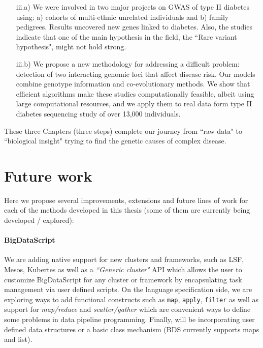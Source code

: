\begin{itemize}
	\begin{itemize}
	\item[iii.a)] We were involved in two major projects on GWAS of type II diabetes using: a) cohorts of multi-ethnic unrelated individuals and b) family pedigrees. Results uncovered new genes linked to diabetes. Also, the studies indicate that one of the main hypothesis in the field, the ``Rare variant hypothesis", might not hold strong.
	
	\item[iii.b)] We propose a new methodology for addressing a difficult problem: detection of two interacting genomic loci that affect disease risk. Our models combine genotype information and co-evolutionary methods. We show that efficient algorithms make these studies computationally feasible, albeit using large computational resources, and we apply them to real data form type II diabetes sequencing study of over 13,000 individuals.
	\end{itemize}
\end{itemize}

These three Chapters (three steps) complete our journey from ``raw data" to ``biological insight" trying to find the genetic causes of complex disease.

\section{Future work}

Here we propose several improvements, extensions and future lines of work for each of the methods developed in this thesis (some of them are currently being developed / explored): \\

\paragraph{BigDataScript}
We are adding native support for new clusters and frameworks, such as LSF, Mesos, Kubertes as well as a \textit{``Generic cluster"} API which allows the user to customize BigDataScript for any cluster or framework by encapsulating task management via user defined scripts. On the language specification side, we are exploring ways to add functional constructs such as \texttt{map}, \texttt{apply}, \texttt{filter} as well as support for \textit{map/reduce} and \textit{scatter/gather} which are convenient ways to define some problems in data pipeline programming. Finally, will be incorporating user defined data structures or a basic class mechanism (BDS currently supports maps and list).

